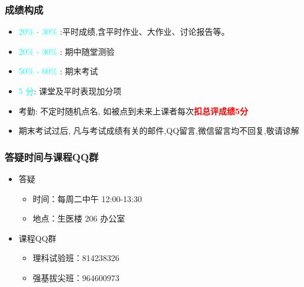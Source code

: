 \begin{frame}
	\frametitle{成绩构成}
	\begin{itemize}[<+-|alert@+>]
		\item {\rm  \textcolor{cyan}{20\% - 30\%}} :平时成绩,含平时作业、大作业、讨论报告等。
		\item  {\rm  \textcolor{cyan}{20\% - 30\%}}  : 期中随堂测验
		\item  {\rm  \textcolor{cyan}{50\% - 60\%}} : 期末考试
		\item \textcolor{cyan}{5 分}: 课堂及平时表现加分项
		\item 考勤: 不定时随机点名, 如被点到未来上课者每次\textcolor{red}{\bf 扣总评成绩5分}
		\item 期末考试过后, 凡与考试成绩有关的邮件,QQ留言,微信留言均不回复,敬请谅解
	\end{itemize}
\end{frame}

\begin{frame}
	\frametitle{答疑时间与课程{\rm QQ}群}
	\begin{itemize}[<+-|alert@+>]
		\item 答疑
		\begin{itemize}[<+-|alert@+>]
			\item 时间：每周二中午 12:00-13:30
			\item 地点：生医楼 206 办公室
		\end{itemize}
		\item 课程{\rm QQ}群
		\begin{itemize}[<+-|alert@+>]
			\item 理科试验班：814238326
			\item 强基拔尖班：964600973
			\end{itemize}
	\end{itemize}
\end{frame}





